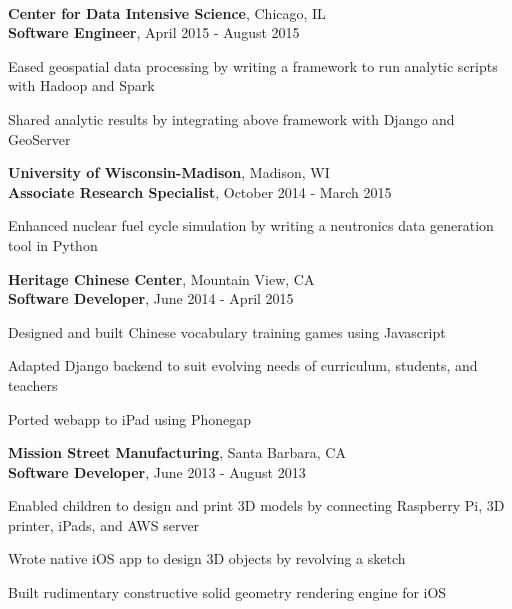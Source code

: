  \\
\textbf{Center for Data Intensive Science}, Chicago, IL \\
\textbf{Software Engineer}, April 2015 - August 2015
\begin{tightlist}

  \item Eased geospatial data processing by writing a framework to run
  analytic scripts with Hadoop and Spark

  \item Shared analytic results by integrating above framework with
  Django and GeoServer

\end{tightlist}
\textbf{University of Wisconsin-Madison}, Madison, WI \\
\textbf{Associate Research Specialist}, October 2014 - March 2015
\begin{tightlist}

  \item Enhanced nuclear fuel cycle simulation by writing a neutronics
  data generation tool in Python

\end{tightlist}
\textbf{Heritage Chinese Center}, Mountain View, CA \\
\textbf{Software Developer}, June 2014 - April 2015
\begin{tightlist}

  \item Designed and built Chinese vocabulary training games using
  Javascript

  \item Adapted Django backend to suit evolving needs of curriculum,
  students, and teachers


  \item Ported webapp to iPad using Phonegap

\end{tightlist}
\textbf{Mission Street Manufacturing}, Santa Barbara, CA \\
\textbf{Software Developer}, June 2013 - August 2013
\begin{tightlist}

  \item Enabled children to design and print 3D models by connecting
  Raspberry Pi, 3D printer, iPads, and AWS server


  \item Wrote native iOS app to design 3D objects by revolving a sketch

  \item Built rudimentary constructive solid geometry rendering engine for iOS

\end{tightlist}
